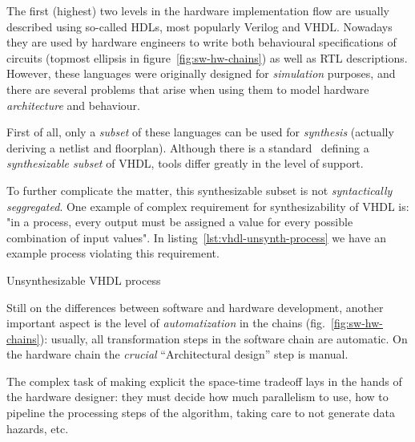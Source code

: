        The first (highest) two levels in the hardware implementation flow are usually described using
        so-called \acp{HDL}, most popularly Verilog and \acs{VHDL}.
        Nowadays they are used by hardware engineers to write both behavioural specifications of circuits
        (topmost ellipsis in figure~\ref{fig:sw-hw-chains}) as well as \ac{RTL} descriptions.
        However, these languages were originally designed for \emph{simulation} purposes,
        and there are several problems that arise when using them to
        model hardware \emph{architecture} and behaviour.

        First of all, only a \emph{subset} of these languages can be used for \emph{synthesis}
        (actually deriving a netlist and floorplan).
        Although there is a standard~\cite{ieee1076-3-synth-vhdl} defining a \emph{synthesizable subset} of \acs{VHDL},
        tools differ greatly in the level of support.

        To further complicate the matter, this synthesizable subset is not \emph{syntactically seggregated}.
        One example of complex requirement for synthesizability of \acs{VHDL} is:
        "in a process, every output must be assigned a value for every possible combination of input values".
        In listing~\ref{lst:vhdl-unsynth-process} we have an example process violating this requirement.

        \begin{listing}[h]
            \begin{center}
            \end{center}
            \caption{Unsynthesizable \acs{VHDL} process \label{lst:vhdl-unsynth-process}}
        \end{listing}

        Still on the differences between software and hardware development,
        another important aspect is the level of \emph{automatization} in the chains (fig.~\ref{fig:sw-hw-chains}):
        usually, all transformation steps in the software chain are automatic.
        On the hardware chain the \emph{crucial} ``Architectural design'' step is manual.

        The complex task of making explicit the space-time tradeoff lays in the hands of the hardware designer:
        they must decide how much parallelism to use, how to pipeline the processing steps of the algorithm,
        taking care to not generate data hazards, etc.


